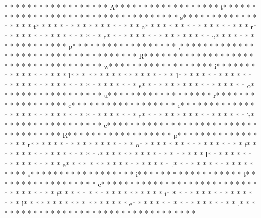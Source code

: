 * * *  * * *  * * *  *  * * *  *  * * *  * A* * *  * * *  * * *  *  * * *  *  * * *  * t* * *  * * *  * * *  *  * * *  *  * * *  *  * * *  * * *  * * *  *  * * *  *  * * *  * s* * *  * * *  * * *  *  * * *  *  * * *  * t* * *  * * *  * * *  *  * * *  *  * * *  * a* * *  * * *  * * *  *  * * *  *  * * *  * r* * *  * * *  * * *  *  * * *  *  * * *  * t* * *  * * *  * * *  *  * * *  *  * * *  * u* * *  * * *  * * *  *  * * *  *  * * *  * p* * *  * * *  * * *  *  * * *  *  * * *  * ,* * *  * * *  * * *  *  * * *  *  * * *  *  * * *  * * *  * * *  *  * * *  *  * * *  * R* * *  * * *  * * *  *  * * *  *  * * *  *  * * *  * * *  * * *  *  * * *  *  * * *  * w* * *  * * *  * * *  *  * * *  *  * * *  * i* * *  * * *  * * *  *  * * *  *  * * *  * l* * *  * * *  * * *  *  * * *  *  * * *  * l* * *  * * *  * * *  *  * * *  *  * * *  *  * * *  * * *  * * *  *  * * *  *  * * *  * s* * *  * * *  * * *  *  * * *  *  * * *  * o* * *  * * *  * * *  *  * * *  *  * * *  * u* * *  * * *  * * *  *  * * *  *  * * *  * r* * *  * * *  * * *  *  * * *  *  * * *  * c* * *  * * *  * * *  *  * * *  *  * * *  * e* * *  * * *  * * *  *  * * *  *  * * *  *  * * *  * * *  * * *  *  * * *  *  * * *  * t* * *  * * *  * * *  *  * * *  *  * * *  * h* * *  * * *  * * *  *  * * *  *  * * *  * e* * *  * * *  * * *  *  * * *  *  * * *  *  * * *  * * *  * * *  *  * * *  *  * * *  * R* * *  * * *  * * *  *  * * *  *  * * *  * p* * *  * * *  * * *  *  * * *  *  * * *  * r* * *  * * *  * * *  *  * * *  *  * * *  * o* * *  * * *  * * *  *  * * *  *  * * *  * f* * *  * * *  * * *  *  * * *  *  * * *  * i* * *  * * *  * * *  *  * * *  *  * * *  * l* * *  * * *  * * *  *  * * *  *  * * *  * e* * *  * * *  * * *  *  * * *  *  * * *  * .* * *  * * *  * * *  *  * * *  *  * * *  * s* * *  * * *  * * *  *  * * *  *  * * *  * i* * *  * * *  * * *  *  * * *  *  * * *  * t* * *  * * *  * * *  *  * * *  *  * * *  * e* * *  * * *  * * *  *  * * *  *  * * *  *  * * *  * * *  * * *  *  * * *  *  * * *  * f* * *  * * *  * * *  *  * * *  *  * * *  * i* * *  * * *  * * *  *  * * *  *  * * *  * l* * *  * * *  * * *  *  * * *  *  * * *  * e* * *  * * *  * * *  *  * * *  *  * * *  * .* * *  * * *  * * *  *  * * *  *  * * *  *  * * *  * * *  * * *  *  * * *  *  * * *  * 
